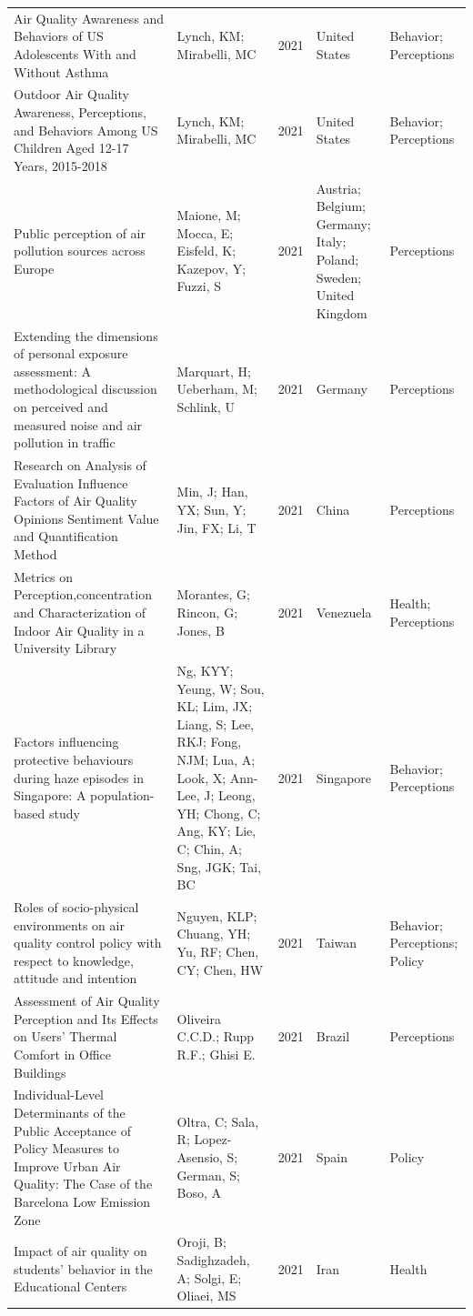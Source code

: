 {\begin{longtable}[t]{p{6cm}p{3cm}lp{3cm}p{3cm}}
\addlinespace
Air Quality Awareness and Behaviors of US Adolescents With and Without Asthma & Lynch, KM; Mirabelli, MC & 2021 & United States & Behavior; Perceptions\\
Outdoor Air Quality Awareness, Perceptions, and Behaviors Among US Children Aged 12-17 Years, 2015-2018 & Lynch, KM; Mirabelli, MC & 2021 & United States & Behavior; Perceptions\\
Public perception of air pollution sources across Europe & Maione, M; Mocca, E; Eisfeld, K; Kazepov, Y; Fuzzi, S & 2021 & Austria; Belgium; Germany; Italy; Poland; Sweden; United Kingdom & Perceptions\\
Extending the dimensions of personal exposure assessment: A methodological discussion on perceived and measured noise and air pollution in traffic & Marquart, H; Ueberham, M; Schlink, U & 2021 & Germany & Perceptions\\
Research on Analysis of Evaluation Influence Factors of Air Quality Opinions Sentiment Value and Quantification Method & Min, J; Han, YX; Sun, Y; Jin, FX; Li, T & 2021 & China & Perceptions\\
\addlinespace
Metrics on Perception,concentration and Characterization of Indoor Air Quality in a University Library & Morantes, G; Rincon, G; Jones, B & 2021 & Venezuela & Health; Perceptions\\
Factors influencing protective behaviours during haze episodes in Singapore: A population-based study & Ng, KYY; Yeung, W; Sou, KL; Lim, JX; Liang, S; Lee, RKJ; Fong, NJM; Lua, A; Look, X; Ann-Lee, J; Leong, YH; Chong, C; Ang, KY; Lie, C; Chin, A; Sng, JGK; Tai, BC & 2021 & Singapore & Behavior; Perceptions\\
Roles of socio-physical environments on air quality control policy with respect to knowledge, attitude and intention & Nguyen, KLP; Chuang, YH; Yu, RF; Chen, CY; Chen, HW & 2021 & Taiwan & Behavior; Perceptions; Policy\\
Assessment of Air Quality Perception and Its Effects on Users' Thermal Comfort in Office Buildings & Oliveira C.C.D.; Rupp R.F.; Ghisi E. & 2021 & Brazil & Perceptions\\
Individual-Level Determinants of the Public Acceptance of Policy Measures to Improve Urban Air Quality: The Case of the Barcelona Low Emission Zone & Oltra, C; Sala, R; Lopez-Asensio, S; German, S; Boso, A & 2021 & Spain & Policy\\
\addlinespace
Impact of air quality on students' behavior in the Educational Centers & Oroji, B; Sadighzadeh, A; Solgi, E; Oliaei, MS & 2021 & Iran & Health\\

\end{longtable}}
